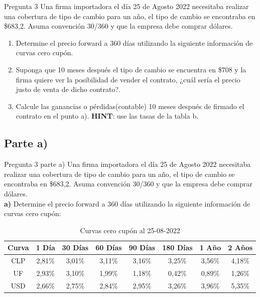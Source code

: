 \documentclass{beamer}
\begin{document}
\newcommand{\forwardmonedas}{\ensuremath{F_0 =  S_0 \cdot{e^{\left(r-r_r\right) \cdot T}}}}

\begin{frame}{Pregunta 3}
  Una firma importadora el día 25 de Agosto 2022 necesitaba realizar una cobertura de tipo de cambio 
para un año, el tipo de cambio se encontraba en \$683,2. Asuma convención 30/360 y que la empresa debe comprar dólares.\\
  \begin{enumerate}[label=\textbf{\alph*)}]
    \item Determine el precio forward a 360 días utilizando la siguiente información de curvas cero cupón.

    \item	Suponga que 10 meses después el tipo de cambio se encuentra en \$708 y la firma quiere ver
    la posibilidad de vender el contrato, ¿cuál sería el precio justo de venta de dicho contrato?.

    \item Calcule las ganancias o pérdidas(contable) 10 meses después de firmado el contrato en el 
        punto a). \textbf{HINT}: use las tasas de la tabla b.
      \end{enumerate}
\end{frame}

\subsection{Parte a)}

\begin{frame}{Pregunta 3 parte a)}
  Una firma importadora el día 25 de Agosto 2022 necesitaba realizar una cobertura de tipo de cambio 
para un año, el tipo de cambio se encontraba en \$683,2. Asuma convención 30/360 y que la empresa debe comprar dólares.\\
\textbf{a)} Determine el precio forward a 360 días utilizando la siguiente información de curvas cero cupón:
\begin{table}[h!]
    \centering
    \scriptsize %
    \caption{Curvas cero cupón al 25-08-2022}
    \begin{tabular}{|c|c|c|c|c|c|c|c|}
    \hline
    \textbf{Curva} & \textbf{1 Día} & \textbf{30 Días} & \textbf{60 Días} & \textbf{90 Días} & \textbf{180 Días} & \textbf{1 Año} & \textbf{2 Años} \\
    \hline
    CLP & 2{,}81\% & 3{,}01\% & 3{,}11\% & 3{,}16\% & 3{,}25\% & 3{,}56\% & 4{,}18\% \\
    UF  & 2{,}93\% & 3{,}10\% & 1{,}99\% & 1{,}18\% & 0{,}42\% & 0{,}89\% & 1{,}26\% \\
    USD & 2{,}66\% & 2{,}75\% & 2{,}84\% & 2{,}95\% & 3{,}26\% & 3{,}96\% & 5{,}35\% \\
    \hline
    \end{tabular}
\end{table}
\end{frame}
\end{document}

